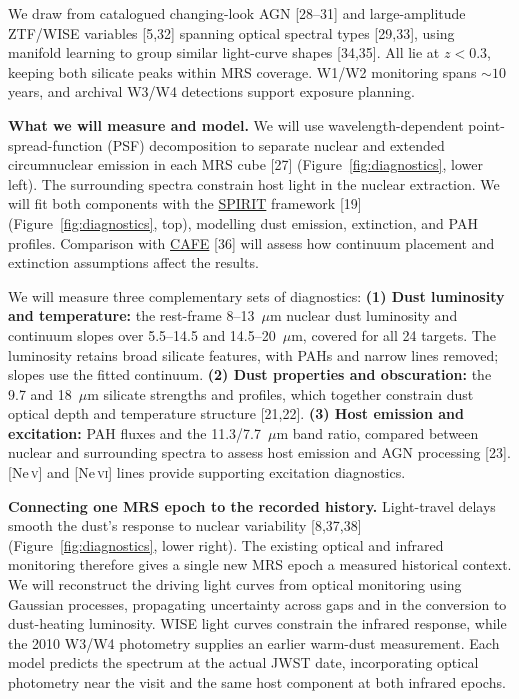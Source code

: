\documentclass[12pt]{article}
\newcommand{\proposalheading}[1]{%
  \par%
  \noindent\textcolor{sectionblue}{\textbf{#1}}\enspace\ignorespaces}
\begin{document}
We draw from catalogued changing-look AGN [28--31] and large-amplitude ZTF/WISE variables [5,32] spanning optical spectral types [29,33], using manifold learning to group similar light-curve shapes [34,35]. All lie at $z<0.3$, keeping both silicate peaks within MRS coverage. W1/W2 monitoring spans $\sim10$ years, and archival W3/W4 detections support exposure planning.

\newpage
\proposalheading{What we will measure and model.}
We will use wavelength-dependent point-spread-function (PSF) decomposition to separate nuclear and extended circumnuclear emission in each MRS cube [27] (Figure~\ref{fig:diagnostics}, lower left). The surrounding spectra constrain host light in the nuclear extraction. We will fit both components with the \href{https://github.com/FergusDonnan/SPIRIT}{SPIRIT} framework [19] (Figure~\ref{fig:diagnostics}, top), modelling dust emission, extinction, and PAH profiles. Comparison with \href{https://github.com/GOALS-survey/CAFE}{CAFE} [36] will assess how continuum placement and extinction assumptions affect the results.

We will measure three complementary sets of diagnostics:
\textbf{(1) Dust luminosity and temperature:} the rest-frame 8--13~$\mu$m nuclear dust luminosity and continuum slopes over 5.5--14.5 and 14.5--20~$\mu$m, covered for all 24 targets. The luminosity retains broad silicate features, with PAHs and narrow lines removed; slopes use the fitted continuum.
\textbf{(2) Dust properties and obscuration:} the 9.7 and 18~$\mu$m silicate strengths and profiles, which together constrain dust optical depth and temperature structure [21,22].
\textbf{(3) Host emission and excitation:} PAH fluxes and the 11.3/7.7~$\mu$m band ratio, compared between nuclear and surrounding spectra to assess host emission and AGN processing [23]. [Ne\,\textsc{v}] and [Ne\,\textsc{vi}] lines provide supporting excitation diagnostics.

\proposalheading{Connecting one MRS epoch to the recorded history.}
Light-travel delays smooth the dust's response to nuclear variability [8,37,38] (Figure~\ref{fig:diagnostics}, lower right). The existing optical and infrared monitoring therefore gives a single new MRS epoch a measured historical context. We will reconstruct the driving light curves from optical monitoring using Gaussian processes, propagating uncertainty across gaps and in the conversion to dust-heating luminosity. WISE light curves constrain the infrared response, while the 2010 W3/W4 photometry supplies an earlier warm-dust measurement. Each model predicts the spectrum at the actual JWST date, incorporating optical photometry near the visit and the same host component at both infrared epochs.
\end{document}
